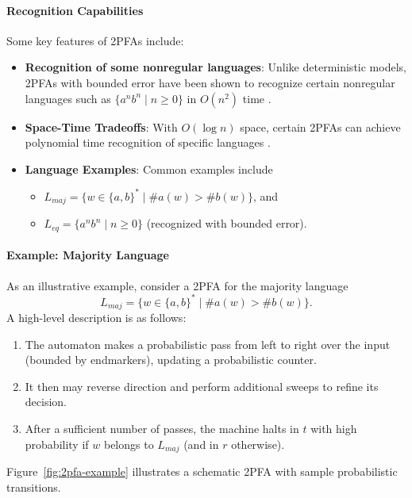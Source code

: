 \paragraph{Recognition Capabilities}
Some key features of 2PFAs include:
\begin{itemize}
    \item \textbf{Recognition of some nonregular languages}: Unlike deterministic models, 2PFAs with bounded error have been shown to recognize certain nonregular languages such as \( \{a^n b^n \mid n \ge 0\}\) in \(O(n^2)\) time \cite{freivalds1981probabilistic}.
    \item \textbf{Space-Time Tradeoffs}: With \(O(\log n)\) space, certain 2PFAs can achieve polynomial time recognition of specific languages \cite{papadimitriou1994computational}.
    \item \textbf{Language Examples}: Common examples include
        \begin{itemize}
            \item \(L_{maj} = \{ w \in \{a,b\}^* \mid \#a(w) > \#b(w) \}\), and
            \item \(L_{eq} = \{a^n b^n \mid n \ge 0\}\) (recognized with bounded error).
        \end{itemize}
\end{itemize}

\paragraph{Example: Majority Language}
As an illustrative example, consider a 2PFA for the majority language
\[
L_{maj} = \{ w \in \{a,b\}^* \mid \#a(w) > \#b(w) \}.
\]
A high-level description is as follows:
\begin{enumerate}
    \item The automaton makes a probabilistic pass from left to right over the input (bounded by endmarkers), updating a probabilistic counter.
    \item It then may reverse direction and perform additional sweeps to refine its decision.
    \item After a sufficient number of passes, the machine halts in \(t\) with high probability if \(w\) belongs to \(L_{maj}\) (and in \(r\) otherwise).
\end{enumerate}
Figure~\ref{fig:2pfa-example} illustrates a schematic 2PFA with sample probabilistic transitions.

